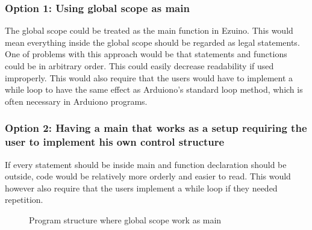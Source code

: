 \subsubsection{Option 1: Using global scope as main}
The global scope could be treated as the main function in Ezuino. This would mean everything inside the global scope should be regarded as legal statements. One of problems with this approach would be that statements and functions could be in arbitrary order. This could easily decrease readability if used improperly.
This would also require that the users would have to implement a while loop to have the same effect as Arduiono's standard loop method, which is often necessary in Arduiono programs. 


\subsubsection{Option 2: Having a main that works as a setup requiring the user to implement his own control structure}
If every statement should be inside main and function declaration should be outside, code would be relatively more orderly and easier to read. 
This would however also require that the users implement a while loop if they needed repetition. 
\begin{figure}[H]
\centering
{}
\caption{Program structure where global scope work as main}
\label{lf10}
\end{figure}

